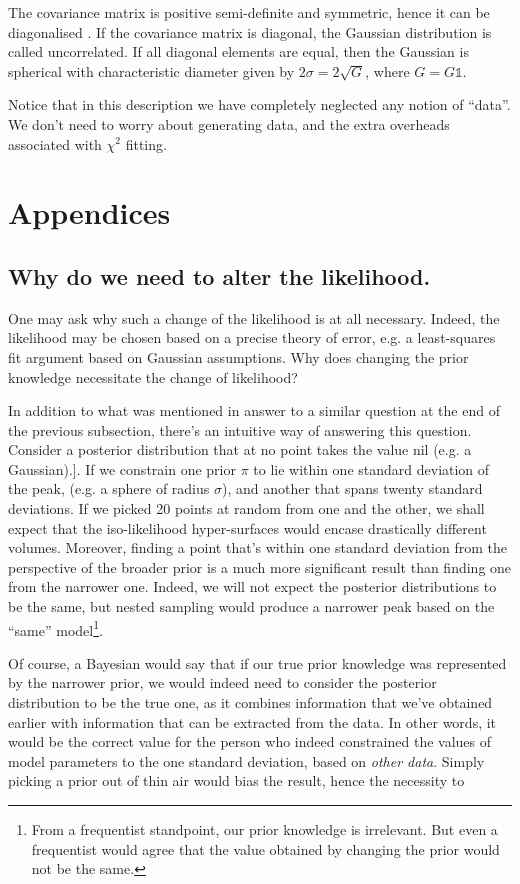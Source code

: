\documentclass[usenatbib]{mnras}
\begin{document}
The covariance matrix is positive semi-definite and symmetric,
hence it can be diagonalised \citep{taboga2017lectures}. If the covariance matrix is diagonal,
the Gaussian distribution is called uncorrelated. If all diagonal
elements are equal, then the Gaussian is spherical with
characteristic diameter given by \(2 \sigma = 2\sqrt{G}\), where \(G = G
   \mathbb{1}\).

Notice that in this description we have completely neglected any
notion of ``data''. We don't need to worry about generating data,
and the extra overheads associated with \(\chi^2\) fitting.


\section{Appendices}
\label{sec:org6c430b6}

\subsection{Why do we need to alter the likelihood. \label{sec:repart-necessity}}
\label{sec:org1ee1d39}
One may ask why such a change of the likelihood is at all
necessary. Indeed, the likelihood may be chosen based on a precise
theory of error, e.g. a least-squares fit argument based on
Gaussian assumptions. Why does changing the prior knowledge
necessitate the change of likelihood?

In addition to what was mentioned in answer to a similar question
at the end of the previous subsection, there's an intuitive way of
answering this question. Consider a posterior distribution that at
no point takes the value nil (e.g. a Gaussian).]. If we constrain one
prior \(\pi\) to lie within one standard deviation of the peak,
(e.g. a sphere of radius \(\sigma\)), and another that spans twenty
standard deviations. If we picked 20 points at random from one and
the other, we shall expect that the iso-likelihood hyper-surfaces
would encase drastically different volumes. Moreover, finding a
point that's within one standard deviation from the perspective of
the broader prior is a much more significant result than finding
one from the narrower one. Indeed, we will not expect the posterior
distributions to be the same, but nested sampling would produce a
narrower peak based on the ``same'' model\footnote{From a   frequentist standpoint, our prior knowledge is irrelevant. But even   a frequentist would agree that the value obtained by changing the   prior would not be the same.}. 

Of course, a Bayesian would say that if our true prior knowledge
was represented by the narrower prior, we would indeed need to
consider the posterior distribution to be the true one, as it
combines information that we've obtained earlier with information
that can be extracted from the data. In other words, it would be
the correct value for the person who indeed constrained the values
of model parameters to the one standard deviation, based on \emph{other
data}. Simply picking a prior out of thin air would bias the result, hence the necessity to 

 

\end{document}
